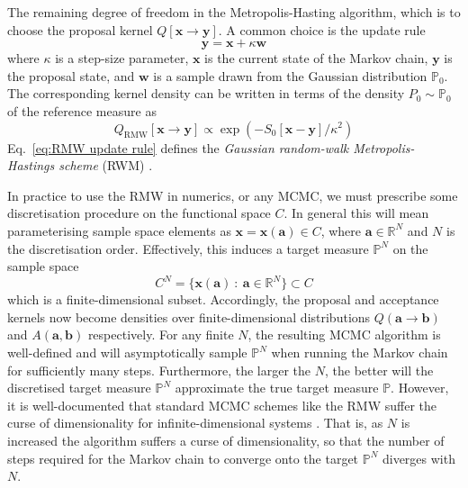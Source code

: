 The remaining degree of freedom in the Metropolis-Hasting algorithm, which is to choose the proposal kernel $Q[\mathbf{x} \to \mathbf{y}]$. A common choice is the update rule
\begin{equation} \label{eq:RMW update rule}
	\mathbf{y} = \mathbf{x} + \kappa \mathbf{w}
\end{equation}
where $\kappa$ is a step-size parameter, $\mathbf{x}$ is the current state of the Markov chain, $\mathbf{y}$ is the proposal state, and $\mathbf{w}$ is a sample drawn from the Gaussian distribution $\mathbb{P}_0$. The corresponding kernel density can be written in terms of the density $P_0 \sim \mathbb{P}_0$ of the reference measure as
\begin{equation} \label{eq:RMW transition kernel}
	Q_\text{RMW}[\mathbf{x} \to \mathbf{y}] \propto \exp ( - S_0[\mathbf{x} - \mathbf{y}] / \kappa^2 ) 
\end{equation}
Eq.~\ref{eq:RMW update rule} defines the \textit{Gaussian random-walk Metropolis-Hastings scheme} (RWM) \citep{metropolisEquationStateCalculations1953a, hastingsMonteCarloSampling1970c}.



In practice to use the RMW in numerics, or any MCMC, we must prescribe some discretisation procedure on the functional space $C$. In general this will mean parameterising sample space elements as $\mathbf{x} = \mathbf{x}(\mathbf{a}) \in C$, where $\mathbf{a} \in \mathbb{R}^N$ and $N$ is the discretisation order. Effectively, this induces a target measure $\mathbb{P}^N$ on the sample space
\begin{equation}
	C^N = \{ \mathbf{x}(\mathbf{a})\ :\ \mathbf{a} \in \mathbb{R}^N \} \subset C
\end{equation}
which is a finite-dimensional subset. Accordingly, the proposal and acceptance kernels now become densities over finite-dimensional distributions $Q(\mathbf{a} \to \mathbf{b})$ and $A(\mathbf{a}, \mathbf{b})$ respectively. For any finite $N$, the resulting MCMC algorithm is well-defined and will asymptotically sample $\mathbb{P}^N$ when running the Markov chain for sufficiently many steps. Furthermore, the larger the $N$, the better will the discretised target measure $\mathbb{P}^N$ approximate the true target measure $\mathbb{P}$. However, it is well-documented that standard MCMC schemes like the RMW suffer the curse of dimensionality \citep{bellmanAdaptiveControlProcesses1961} for infinite-dimensional systems \citep{cotterMCMCMethodsFunctions2013a, hairerSpectralGapsMetropolis2014a}. That is, as $N$ is increased the algorithm suffers a curse of dimensionality, so that the number of steps required for the Markov chain to converge onto the target $\mathbb{P}^N$ diverges with $N$.

